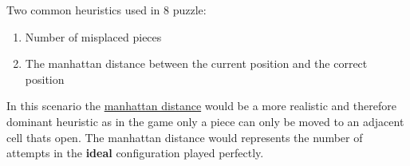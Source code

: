 \documentclass[
  letterpaper,
  DIV=11,
  numbers=noendperiod]{scrartcl}
\providecommand{\tightlist}{%
  \setlength{\itemsep}{0pt}\setlength{\parskip}{0pt}}\usepackage{longtable,booktabs,array}
\begin{document}
Two common heuristics used in 8 puzzle:

\begin{enumerate}
\def\labelenumi{\arabic{enumi}.}
\tightlist
\item
  Number of misplaced pieces
\item
  The manhattan distance between the current position and the correct
  position
\end{enumerate}

In this scenario the \hyperref[manhattan_distance]{manhattan distance}
would be a more realistic and therefore dominant heuristic as in the
game only a piece can only be moved to an adjacent cell thats open. The
manhattan distance would represents the number of attempts in the
\textbf{ideal} configuration played perfectly.
\end{document}
